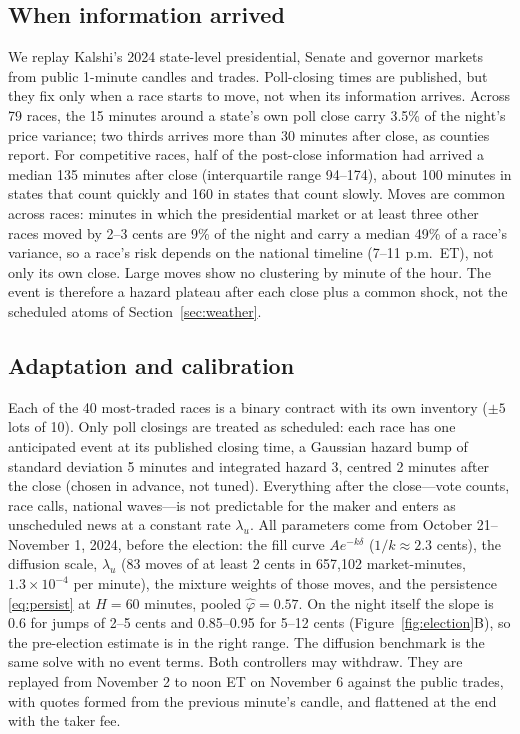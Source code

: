 \documentclass[11pt]{article}
\newcommand{\1}{\mathbf 1}
\begin{document}
\subsection{When information arrived}
We replay Kalshi's 2024 state-level presidential, Senate and governor markets
from public 1-minute candles and trades. Poll-closing times are published, but
they fix only when a race starts to move, not when its information arrives. Across
79 races, the 15 minutes around a state's own poll close carry 3.5\% of the night's
price variance; two thirds arrives more than 30 minutes after close, as counties
report. For competitive races, half of the post-close information had arrived a
median 135 minutes after close (interquartile range 94--174), about 100 minutes in
states that count quickly and 160 in states that count slowly. Moves are common
across races: minutes in which the presidential market or at least three other
races moved by 2--3 cents are 9\% of the night and carry a median 49\% of a race's
variance, so a race's risk depends on the national timeline (7--11 p.m.\ ET), not
only its own close. Large moves show no clustering by minute of the hour. The
event is therefore a hazard plateau after each close plus a common shock, not the
scheduled atoms of Section~\ref{sec:weather}.

\subsection{Adaptation and calibration}
Each of the 40 most-traded races is a binary contract with its own inventory
($\pm5$ lots of 10). Only poll closings are treated as scheduled: each race has one
anticipated event at its published closing time, a Gaussian hazard bump of
standard deviation 5 minutes and integrated hazard 3, centred 2 minutes after the
close (chosen in advance, not tuned). Everything after the close---vote counts,
race calls, national waves---is not predictable for the maker and enters as
unscheduled news at a constant rate $\lambda_u$. All parameters come from
October 21--November 1, 2024, before the election: the fill curve
$Ae^{-k\delta}$ ($1/k\approx2.3$ cents), the diffusion scale, $\lambda_u$ (83 moves of at
least 2 cents in 657{,}102 market-minutes, $1.3\times10^{-4}$ per minute), the mixture
weights of those moves, and the persistence \eqref{eq:persist} at $H=60$ minutes,
pooled $\hat\varphi=0.57$. On the night itself the slope is 0.6 for jumps of 2--5
cents and 0.85--0.95 for 5--12 cents (Figure~\ref{fig:election}B), so the
pre-election estimate is in the right range. The diffusion benchmark is the same
solve with no event terms. Both controllers may withdraw. They are replayed from
November 2 to noon ET on November 6 against the public trades, with quotes formed
from the previous minute's candle, and flattened at the end with the taker fee.
\end{document}
